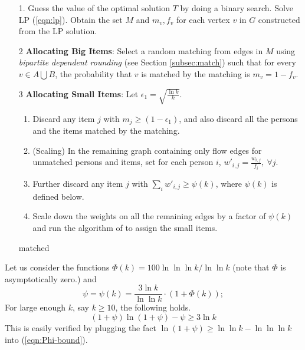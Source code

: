 \begin{enumerate}
\item[1.] Guess the value of the optimal solution $T$ by doing a binary search. Solve LP (\ref{eqn:lp}).
  Obtain the set $M$ and $m_v, f_v$ for each vertex $v$ in $G$ constructed from the LP solution.

  \bigskip

\item[2] {\bf Allocating Big Items}: Select a random matching from edges in $M$ using { \em bipartite dependent rounding}
(see Section \ref{subsec:match}) such that for every $v \in A \bigcup B$, the probability that $v$ is matched by the matching is $m_v=1-f_v$.

\bigskip

\item[3] {\bf Allocating Small Items}: Let $\epsilon_1=\sqrt{\frac{\ln{k}}{k}}$.
\begin{enumerate}
\item Discard any item $j$ with $m_{j} \geq (1-\epsilon_1)$, and also discard all the persons and the items matched by the matching.
\item (Scaling) In the remaining graph containing only flow edges for unmatched persons and items, set for each
person $i$, $w'_{i,j}=\frac{w_{i,j}}{f_{i}}, ~ \forall j$.
\item Further discard any item  $j$ with $\sum_{i} w'_{i,j} \geq \psi(k)$, where $\psi(k)$ is defined below.
\item Scale down the weights on all the remaining edges by a factor of $\psi(k)$ and run the algorithm of \cite{dani:05} to assign the small items.
\end{enumerate}

matched
\end{enumerate}




Let us consider the functions $\Phi(k) = 100 \ln\ln\ln k / \ln\ln k$ (note that
$\Phi$ is asymptotically zero.) and
\begin{equation}
\label{eqn:psi-bound}
\psi = \psi(k) = \frac{3 \ln k}{\ln \ln k} \cdot (1 + \Phi(k));
\end{equation}
For large enough $k$, say $k \geq 10$, the following holds.
\begin{equation}
\label{eqn:Phi-bound}
(1 + \psi) \ln(1 + \psi) - \psi \geq 3 \ln k
\end{equation}
 This is easily verified by plugging the fact $\ln(1 + \psi) \geq \ln\ln k - \ln\ln\ln k$ into (\ref{eqn:Phi-bound}).

